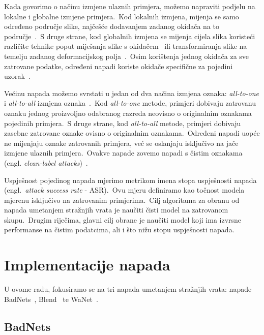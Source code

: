 \documentclass[diplomskirad]{fer}
\begin{document}
Kada govorimo o načinu izmjene ulaznih primjera, možemo napraviti podjelu na lokalne i globalne izmjene primjera.\ Kod lokalnih izmjena, mijenja se samo određeno područje slike, najčešće dodavanjem zadanog okidača na to područje~\cite{gu2019badnets}.\ 
S druge strane, kod globalnih izmjena se mijenja cijela slika koristeći različite tehnike poput miješanja slike s okidačem~\cite{chen2020backdoor} ili transformiranja slike na temelju zadanog deformacijskog polja~\cite{nguyen2021wanet}.\ 
Osim korištenja jednog okidača za sve zatrovane podatke, određeni napadi koriste okidače specifične za pojedini uzorak~\cite{li2021invisible}.\
  
Većinu napada možemo svrstati u jedan od dva načina izmjena oznaka: \textit{all-to-one} i \textit{all-to-all} izmjena oznaka~\cite{doan2022marksman}.\ 
Kod \textit{all-to-one} metode, primjeri dobivaju zatrovanu oznaku jednog proizvoljno odabranog razreda neovisno o originalnim oznakama pojedinih primjera.\ 
S druge strane, kod \textit{all-to-all} metode, primjeri dobivaju zasebne zatrovane oznake ovisno o originalnim oznakama.\ 
Određeni napadi uopće ne mijenjaju oznake zatrovanih primjera, već se oslanjaju isključivo na jače izmjene ulaznih primjera.\ Ovakve napade zovemo napadi s čistim oznakama (engl. \textit{clean-label attacks})~\cite{barni2019new}.\
  
Uspješnost pojedinog napada mjerimo metrikom imena stopa uspješnosti napada (engl.\ \textit{attack success rate} - ASR).\ Ovu mjeru definiramo kao točnost modela mjerenu isključivo na zatrovanim primjerima.\ 
Cilj algoritama za obranu od napada umetanjem stražnjih vrata je naučiti čisti model na zatrovanom skupu.\ Drugim riječima, glavni cilj obrane je naučiti model koji ima izvrsne performanse na čistim podatcima, ali i što nižu stopu uspješnosti napada.\ 

\section{Implementacije napada}
\label{sek:impl_napada}

U ovome radu, fokusiramo se na tri napada umetanjem stražnjih vrata: napade BadNets~\cite{gu2019badnets}, Blend~\cite{chen2020backdoor} te WaNet~\cite{nguyen2021wanet}.\
  
\subsection{BadNets}
\label{sub:badnets}
\end{document}
